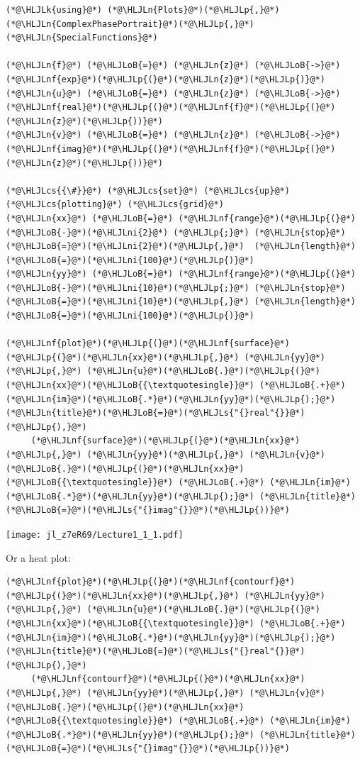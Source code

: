 \documentclass[12pt,a4paper]{article}
\newcommand{\HLJLk}[1]{\textcolor[RGB]{148,91,176}{\textbf{#1}}}
\newcommand{\HLJLn}[1]{#1}
\newcommand{\HLJLnf}[1]{\textcolor[RGB]{66,102,213}{#1}}
\newcommand{\HLJLs}[1]{\textcolor[RGB]{201,61,57}{#1}}
\newcommand{\HLJLni}[1]{\textcolor[RGB]{59,151,46}{#1}}
\newcommand{\HLJLoB}[1]{\textcolor[RGB]{102,102,102}{\textbf{#1}}}
\newcommand{\HLJLp}[1]{#1}
\newcommand{\HLJLcs}[1]{\textcolor[RGB]{153,153,119}{\textit{#1}}}
\begin{document}
\begin{lstlisting}
(*@\HLJLk{using}@*) (*@\HLJLn{Plots}@*)(*@\HLJLp{,}@*) (*@\HLJLn{ComplexPhasePortrait}@*)(*@\HLJLp{,}@*) (*@\HLJLn{SpecialFunctions}@*)

(*@\HLJLn{f}@*) (*@\HLJLoB{=}@*) (*@\HLJLn{z}@*) (*@\HLJLoB{->}@*) (*@\HLJLnf{exp}@*)(*@\HLJLp{(}@*)(*@\HLJLn{z}@*)(*@\HLJLp{)}@*)
(*@\HLJLn{u}@*) (*@\HLJLoB{=}@*) (*@\HLJLn{z}@*) (*@\HLJLoB{->}@*) (*@\HLJLnf{real}@*)(*@\HLJLp{(}@*)(*@\HLJLnf{f}@*)(*@\HLJLp{(}@*)(*@\HLJLn{z}@*)(*@\HLJLp{))}@*)
(*@\HLJLn{v}@*) (*@\HLJLoB{=}@*) (*@\HLJLn{z}@*) (*@\HLJLoB{->}@*) (*@\HLJLnf{imag}@*)(*@\HLJLp{(}@*)(*@\HLJLnf{f}@*)(*@\HLJLp{(}@*)(*@\HLJLn{z}@*)(*@\HLJLp{))}@*)

(*@\HLJLcs{{\#}}@*) (*@\HLJLcs{set}@*) (*@\HLJLcs{up}@*) (*@\HLJLcs{plotting}@*) (*@\HLJLcs{grid}@*)
(*@\HLJLn{xx}@*) (*@\HLJLoB{=}@*) (*@\HLJLnf{range}@*)(*@\HLJLp{(}@*)(*@\HLJLoB{-}@*)(*@\HLJLni{2}@*) (*@\HLJLp{;}@*) (*@\HLJLn{stop}@*)(*@\HLJLoB{=}@*)(*@\HLJLni{2}@*)(*@\HLJLp{,}@*)  (*@\HLJLn{length}@*)(*@\HLJLoB{=}@*)(*@\HLJLni{100}@*)(*@\HLJLp{)}@*)
(*@\HLJLn{yy}@*) (*@\HLJLoB{=}@*) (*@\HLJLnf{range}@*)(*@\HLJLp{(}@*)(*@\HLJLoB{-}@*)(*@\HLJLni{10}@*)(*@\HLJLp{;}@*) (*@\HLJLn{stop}@*)(*@\HLJLoB{=}@*)(*@\HLJLni{10}@*)(*@\HLJLp{,}@*) (*@\HLJLn{length}@*)(*@\HLJLoB{=}@*)(*@\HLJLni{100}@*)(*@\HLJLp{)}@*)

(*@\HLJLnf{plot}@*)(*@\HLJLp{(}@*)(*@\HLJLnf{surface}@*)(*@\HLJLp{(}@*)(*@\HLJLn{xx}@*)(*@\HLJLp{,}@*) (*@\HLJLn{yy}@*)(*@\HLJLp{,}@*) (*@\HLJLn{u}@*)(*@\HLJLoB{.}@*)(*@\HLJLp{(}@*)(*@\HLJLn{xx}@*)(*@\HLJLoB{{\textquotesingle}}@*) (*@\HLJLoB{.+}@*) (*@\HLJLn{im}@*)(*@\HLJLoB{.*}@*)(*@\HLJLn{yy}@*)(*@\HLJLp{);}@*) (*@\HLJLn{title}@*)(*@\HLJLoB{=}@*)(*@\HLJLs{"{}real"{}}@*)(*@\HLJLp{),}@*)
     (*@\HLJLnf{surface}@*)(*@\HLJLp{(}@*)(*@\HLJLn{xx}@*)(*@\HLJLp{,}@*) (*@\HLJLn{yy}@*)(*@\HLJLp{,}@*) (*@\HLJLn{v}@*)(*@\HLJLoB{.}@*)(*@\HLJLp{(}@*)(*@\HLJLn{xx}@*)(*@\HLJLoB{{\textquotesingle}}@*) (*@\HLJLoB{.+}@*) (*@\HLJLn{im}@*)(*@\HLJLoB{.*}@*)(*@\HLJLn{yy}@*)(*@\HLJLp{);}@*) (*@\HLJLn{title}@*)(*@\HLJLoB{=}@*)(*@\HLJLs{"{}imag"{}}@*)(*@\HLJLp{))}@*)
\end{lstlisting}

\texttt{[image: jl\_z7eR69/Lecture1\_1\_1.pdf]}

Or a heat plot:


\begin{lstlisting}
(*@\HLJLnf{plot}@*)(*@\HLJLp{(}@*)(*@\HLJLnf{contourf}@*)(*@\HLJLp{(}@*)(*@\HLJLn{xx}@*)(*@\HLJLp{,}@*) (*@\HLJLn{yy}@*)(*@\HLJLp{,}@*) (*@\HLJLn{u}@*)(*@\HLJLoB{.}@*)(*@\HLJLp{(}@*)(*@\HLJLn{xx}@*)(*@\HLJLoB{{\textquotesingle}}@*) (*@\HLJLoB{.+}@*) (*@\HLJLn{im}@*)(*@\HLJLoB{.*}@*)(*@\HLJLn{yy}@*)(*@\HLJLp{);}@*) (*@\HLJLn{title}@*)(*@\HLJLoB{=}@*)(*@\HLJLs{"{}real"{}}@*)(*@\HLJLp{),}@*)
     (*@\HLJLnf{contourf}@*)(*@\HLJLp{(}@*)(*@\HLJLn{xx}@*)(*@\HLJLp{,}@*) (*@\HLJLn{yy}@*)(*@\HLJLp{,}@*) (*@\HLJLn{v}@*)(*@\HLJLoB{.}@*)(*@\HLJLp{(}@*)(*@\HLJLn{xx}@*)(*@\HLJLoB{{\textquotesingle}}@*) (*@\HLJLoB{.+}@*) (*@\HLJLn{im}@*)(*@\HLJLoB{.*}@*)(*@\HLJLn{yy}@*)(*@\HLJLp{);}@*) (*@\HLJLn{title}@*)(*@\HLJLoB{=}@*)(*@\HLJLs{"{}imag"{}}@*)(*@\HLJLp{))}@*)
\end{lstlisting}
\end{document}
